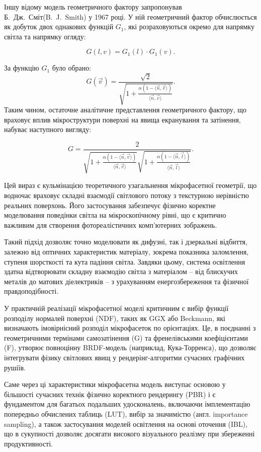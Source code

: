 Іншу відому модель геометричного фактору запропонував Б.~Дж.~Сміт\linebreak (B.~J.~Smith) у 1967 році. 
У ній геометричний фактор обчислюється як добуток двох однакових функцій $G_1$, які розраховуються окремо для напрямку світла та напрямку огляду:

\[
G(l, v) = G_1(l) \cdot G_1(v).
\]

За функцію $G_1$ було обрано:
\begin{equation*}
  G(\vec{v}) = \frac{\sqrt{2}}{\sqrt{1 + \frac{\alpha(1-\langle\vec{n},\vec{v}\rangle)}{\langle\vec{n},\vec{v}\rangle}}}.
\end{equation*}
Таким чином, остаточне аналітичне представлення геометричного фактору, що враховує вплив мікроструктури поверхні на явища екранування та за\-ті\-нен\-ня, набуває наступного вигляду:

\begin{equation}
  \label{eq:GT}
G = \frac{2}{\sqrt{1 + \frac{\alpha(1-\langle\vec{n},\vec{v}\rangle)}{\langle\vec{n},\vec{v}\rangle}}
\sqrt{1 + \frac{\alpha(1-\langle\vec{n},\vec{l}\rangle)}{\langle\vec{n},\vec{l}\rangle}}}.
\end{equation}

Цей вираз є кульмінацією теоретичного узагальнення мікрофасетної геометрії, що водночас 
враховує складні взаємодії світлового потоку з текстурною нерівністю реальних поверхонь. Його 
застосування забезпечує фізично коректне моделювання поведінки світла на мікроскопічному рівні, що 
є критично важливим для створення фотореалістичних комп’ютерних зображень.

\par Такий підхід дозволяє точно моделювати як дифузні, так і дзеркальні відбиття, залежно від
оптичних характеристик матеріалу, зокрема показника заломлення, ступеня шорсткості та кута падіння 
світла. Завдяки цьому, система освітлення здатна відтворювати складну взаємодію світла з матеріалом -- 
від блискучих металів до матових діелектриків -- з урахуванням енергозбереження та фізичної правдоподібності.

\par У практичній реалізації мікрофасетної моделі критичним є вибір функції розподілу нормалей 
поверхні (NDF), таких як GGX або Beckmann, які визначають імовірнісний розподіл мікрофасеток по орієнтаціях. 
Це, в поєднанні з геометричними термінами самозатінення (G) та френелівськими коефіцієнтами (F), утворює 
повноцінну BRDF-модель (наприклад, Кука-Торренса), що дозволяє інтегрувати фізику світлових явищ 
у рендерінг-алгоритми сучасних графічних рушіїв.

\par Саме через ці характеристики мікрофасетна модель виступає основою у більшості сучасних 
технік фізично коректного рендерингу (PBR) і є фундаментом для багатьох подальших удосконалень, 
включаючи імплементацію попередньо обчислених таблиць (LUT), вибір за значимістю (англ. importance sampling), а також 
застосування моделей освітлення на основі оточення (IBL), що в сукупності дозволяє досягати високого 
візуального реалізму при збереженні продуктивності.
